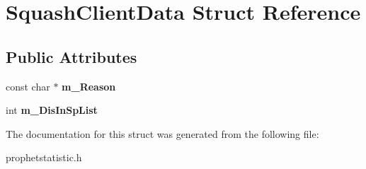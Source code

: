 \hypertarget{structSquashClientData}{
\section{SquashClientData Struct Reference}
\label{structSquashClientData}
}
\subsection*{Public Attributes}
\begin{DoxyCompactItemize}
\item 
\hypertarget{structSquashClientData_a02d8bd7ce5dcbdecc42d2286c5f4d792}{
const char $\ast$ {\bfseries m\_\-Reason}}
\label{structSquashClientData_a02d8bd7ce5dcbdecc42d2286c5f4d792}

\item 
\hypertarget{structSquashClientData_a6203a9812d96721ec44613d996977cdf}{
int {\bfseries m\_\-DisInSpList}}
\label{structSquashClientData_a6203a9812d96721ec44613d996977cdf}

\end{DoxyCompactItemize}


The documentation for this struct was generated from the following file:\begin{DoxyCompactItemize}
\item 
prophetstatistic.h\end{DoxyCompactItemize}
